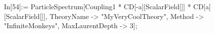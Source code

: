 In[54]:= ParticleSpectrum[Coupling1 * CD[-a][ScalarField[]] * CD[a][ScalarField[]], TheoryName -> "MyVeryCoolTheory", Method -> "InfiniteMonkeys", MaxLaurentDepth -> 3]; 